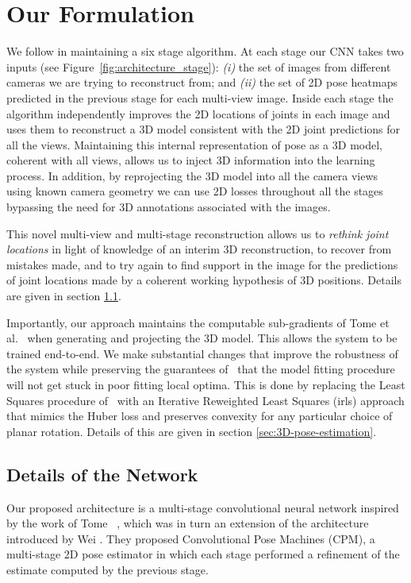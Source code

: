 \documentclass[10pt,twocolumn,letterpaper]{article}
\begin{document}
\section{Our Formulation}




We follow \cite{wei2016convolutional,tome2017lifting} in maintaining a
six stage algorithm. At each stage our CNN takes two inputs (see
Figure~\ref{fig:architecture_stage}): {\em (i)} the set of images from
different cameras we are trying to reconstruct from; and {\em (ii)}
the set of 2D pose heatmaps predicted in the previous stage for each
multi-view image. Inside each stage the algorithm independently
improves the 2D locations of joints in each image and uses them to
reconstruct a 3D model consistent with the 2D joint predictions for
all the views. Maintaining this internal representation of pose as a
3D model, coherent with all views, allows us to inject 3D information
into the learning process. In addition, by reprojecting the 3D model
into all the camera views using  known camera geometry we can use
2D losses throughout all the stages bypassing the need for 3D
annotations associated with the images.  






This novel multi-view and multi-stage reconstruction allows us to {\em
  rethink joint locations} in light of knowledge of an interim 3D
reconstruction, to recover from mistakes made, and to try again to
find support in the image for the predictions of joint locations made
by a coherent working hypothesis of 3D positions. Details  are
given in section \ref{sec:network}.

 Importantly, our approach maintains the computable sub-gradients of Tome et
 al.~\cite{tome2017lifting} when generating and projecting the 3D model. This
 allows the system to be trained end-to-end. We make substantial changes that
 improve the robustness of the system while preserving the guarantees
 of~\cite{tome2017lifting} that the model fitting procedure will not get stuck
 in poor fitting local optima. This is done by replacing the Least Squares
 procedure of~\cite{tome2017lifting} with an Iterative Reweighted Least
 Squares ({\sc irls}) approach that mimics the Huber loss and preserves convexity
 for any particular choice of planar rotation. Details of this are given in
 section \ref{sec:3D-pose-estimation}.

 
\subsection{Details of the Network}
\label{sec:network}
Our proposed architecture is a multi-stage convolutional neural network inspired
by the work of Tome \etal~\cite{tome2017lifting}, which was in turn an extension
of the architecture introduced by Wei \etal\cite{wei2016convolutional}. They
proposed Convolutional Pose Machines (CPM), a multi-stage 2D pose estimator in
which each stage performed a refinement of the estimate computed
by the previous stage. 
\end{document}
